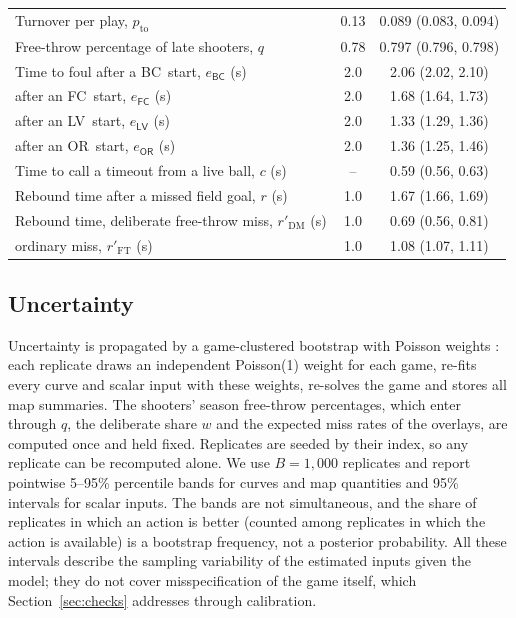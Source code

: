 \documentclass[article]{jdssv}
\newcommand{\BC}{\textsf{BC}}
\newcommand{\FC}{\textsf{FC}}
\newcommand{\LV}{\textsf{LV}}
\newcommand{\OR}{\textsf{OR}}
\begin{document}
\begin{table}[t]
\begin{tabular}{lcc}
Turnover per play, $p_{\mathrm{to}}$ & 0.13 & 0.089 (0.083, 0.094)\\
Free-throw percentage of late shooters, $q$ & 0.78 & 0.797 (0.796, 0.798)\\
Time to foul after a \BC\ start, $e_{\BC}$ (s) & 2.0 & 2.06 (2.02, 2.10)\\
\quad after an \FC\ start, $e_{\FC}$ (s) & 2.0 & 1.68 (1.64, 1.73)\\
\quad after an \LV\ start, $e_{\LV}$ (s) & 2.0 & 1.33 (1.29, 1.36)\\
\quad after an \OR\ start, $e_{\OR}$ (s) & 2.0 & 1.36 (1.25, 1.46)\\
Time to call a timeout from a live ball, $c$ (s) & -- & 0.59 (0.56, 0.63)\\
Rebound time after a missed field goal, $r$ (s) & 1.0 & 1.67 (1.66, 1.69)\\
Rebound time, deliberate free-throw miss, $r'_{\mathrm{DM}}$ (s) & 1.0 & 0.69 (0.56, 0.81)\\
\quad ordinary miss, $r'_{\mathrm{FT}}$ (s) & 1.0 & 1.08 (1.07, 1.11)\\
\bottomrule
\end{tabular}
\end{table}

\subsection{Uncertainty}

Uncertainty is propagated by a game-clustered bootstrap with Poisson weights \citep{EfronTibshirani1993,
OwenEckles2012}: each replicate draws an independent Poisson(1) weight for each game, re-fits every curve and
scalar input with these weights, re-solves the game and stores all map summaries. The shooters' season
free-throw percentages, which enter through $q$, the deliberate share $w$ and the expected miss rates of the
overlays, are computed once and held fixed. Replicates
are seeded by their index, so any replicate can be recomputed alone. We use $B=1{,}000$ replicates and report
pointwise 5--95\% percentile bands for curves and map quantities and 95\% intervals for scalar inputs. The
bands are not simultaneous, and the
share of replicates in which an action is better (counted among replicates in which the action is available) is
a bootstrap frequency, not a posterior probability. All these intervals describe the sampling variability of the estimated
inputs given the model; they do not cover misspecification of the game itself, which
Section~\ref{sec:checks} addresses through calibration.
\end{document}

